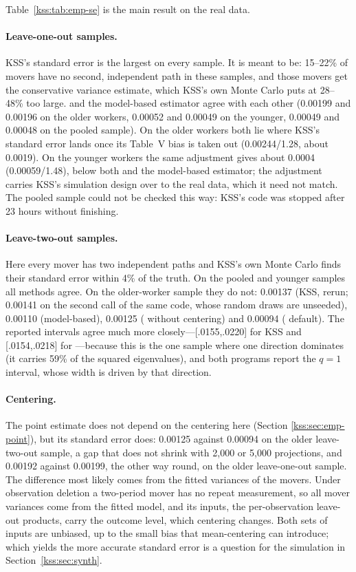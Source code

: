 Table~\ref{kss:tab:emp-se} is the main result on the real data.

\paragraph{Leave-one-out samples.} KSS's standard error is the largest on every sample. It is meant to be:
15--22\% of movers have no second, independent path in these samples, and those movers get the
conservative variance estimate, which KSS's own Monte Carlo puts at 28--48\% too large. \fevc{} and the
model-based estimator agree with each other (0.00199 and 0.00196 on the older workers, 0.00052 and 0.00049
on the younger, 0.00049 and 0.00048 on the pooled sample). On the older workers both lie where KSS's standard
error lands once its Table~V bias is taken out (0.00244/1.28, about 0.0019). On the younger workers the same
adjustment gives about 0.0004 (0.00059/1.48), below both \fevc{} and the model-based estimator; the adjustment
carries KSS's simulation design over to the real data, which it need not match. The pooled sample could not be
checked this way: KSS's code was stopped after 23 hours without finishing.

\paragraph{Leave-two-out samples.} Here every mover has two independent paths and KSS's own Monte Carlo
finds their standard error within 4\% of the truth. On the pooled and younger samples all methods agree. On the
older-worker sample they do not: 0.00137 (KSS, rerun; 0.00141 on the second call of the same code, whose
random draws are unseeded), 0.00110 (model-based), 0.00125 (\fevc{} without centering) and 0.00094 (\fevc{}
default). The reported intervals agree much more closely---[.0155,.0220] for KSS and [.0154,.0218] for
\fevc---because this is the one sample where one direction dominates (it carries 59\% of the squared
eigenvalues), and both programs report the $q=1$ interval, whose width is driven by that direction.

\paragraph{Centering.} The \fevc{} point estimate does not depend on the centering here (Section
\ref{kss:sec:emp-point}), but its standard error does: 0.00125 against 0.00094 on the older leave-two-out sample,
a gap that does not shrink with 2{,}000 or 5{,}000 projections, and 0.00192 against 0.00199, the other way
round, on the older leave-one-out sample. The difference most likely comes from the fitted variances of the
movers. Under observation deletion a two-period mover has no repeat measurement, so all mover variances come
from the fitted model, and its inputs, the per-observation leave-out products, carry the outcome level, which
centering changes. Both sets of inputs are unbiased, up to the small bias that mean-centering can introduce;
which yields the more accurate standard error is a question for the simulation in Section~\ref{kss:sec:synth}.


